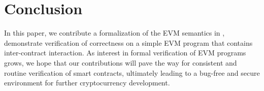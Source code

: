\section{Conclusion}
In this paper, we contribute a formalization of the EVM semantics in \K{},
demonstrate verification of correctness on a simple EVM program that contains
inter-contract interaction. As interest in formal verification of EVM programs
grows, we hope that our contributions will pave the way for consistent and
routine verification of smart contracts, ultimately leading to a bug-free and
secure environment for further cryptocurrency development.
